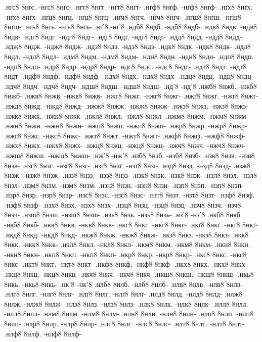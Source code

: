 {.нґс8 8нґс. -нґс8 8нґс-
.нґт8 8нґт. -нґт8 8нґт-
.нґф8 8нґф. -нґф8 8нґф-
.нґх8 8нґх. -нґх8 8нґх-
.нґц8 8нґц. -нґц8 8нґц-
.нґч8 8нґч. -нґч8 8нґч-
.нґш8 8нґш. -нґш8 8нґш-
.нґь8 8нґь. -нґь8 8нґь-
.нґ'8 -нґ'8
.ндб8 8ндб. -ндб8 8ндб-
.ндв8 8ндв. -ндв8 8ндв-
.ндг8 8ндг. -ндг8 8ндг-
.ндґ8 8ндґ. -ндґ8 8ндґ-
.ндд8 8ндд. -ндд8 8ндд-
.ндж8 8ндж. -ндж8 8ндж-
.ндз8 8ндз. -ндз8 8ндз-
.ндк8 8ндк. -ндк8 8ндк-
.ндл8 8ндл. -ндл8 8ндл-
.ндм8 8ндм. -ндм8 8ндм-
.ндн8 8ндн. -ндн8 8ндн-
.ндп8 8ндп. -ндп8 8ндп-
.ндр8 8ндр. -ндр8 8ндр-
.ндс8 8ндс. -ндс8 8ндс-
.ндт8 8ндт. -ндт8 8ндт-
.ндф8 8ндф. -ндф8 8ндф-
.ндх8 8ндх. -ндх8 8ндх-
.ндц8 8ндц. -ндц8 8ндц-
.ндч8 8ндч. -ндч8 8ндч-
.ндш8 8ндш. -ндш8 8ндш-
.нд'8 -нд'8
.нжб8 8нжб. -нжб8 8нжб-
.нжв8 8нжв. -нжв8 8нжв-
.нжг8 8нжг. -нжг8 8нжг-
.нжґ8 8нжґ. -нжґ8 8нжґ-
.нжд8 8нжд. -нжд8 8нжд-
.нжж8 8нжж. -нжж8 8нжж-
.нжз8 8нжз. -нжз8 8нжз-
.нжк8 8нжк. -нжк8 8нжк-
.нжл8 8нжл. -нжл8 8нжл-
.нжм8 8нжм. -нжм8 8нжм-
.нжн8 8нжн. -нжн8 8нжн-
.нжп8 8нжп. -нжп8 8нжп-
.нжр8 8нжр. -нжр8 8нжр-
.нжс8 8нжс. -нжс8 8нжс-
.нжт8 8нжт. -нжт8 8нжт-
.нжф8 8нжф. -нжф8 8нжф-
.нжх8 8нжх. -нжх8 8нжх-
.нжц8 8нжц. -нжц8 8нжц-
.нжч8 8нжч. -нжч8 8нжч-
.нжш8 8нжш. -нжш8 8нжш-
.нж'8 -нж'8
.нзб8 8нзб. -нзб8 8нзб-
.нзв8 8нзв. -нзв8 8нзв-
.нзг8 8нзг. -нзг8 8нзг-
.нзґ8 8нзґ. -нзґ8 8нзґ-
.нзд8 8нзд. -нзд8 8нзд-
.нзж8 8нзж. -нзж8 8нзж-
.нзз8 8нзз. -нзз8 8нзз-
.нзк8 8нзк. -нзк8 8нзк-
.нзл8 8нзл. -нзл8 8нзл-
.нзм8 8нзм. -нзм8 8нзм-
.нзн8 8нзн. -нзн8 8нзн-
.нзп8 8нзп. -нзп8 8нзп-
.нзр8 8нзр. -нзр8 8нзр-
.нзс8 8нзс. -нзс8 8нзс-
.нзт8 8нзт. -нзт8 8нзт-
.нзф8 8нзф. -нзф8 8нзф-
.нзх8 8нзх. -нзх8 8нзх-
.нзц8 8нзц. -нзц8 8нзц-
.нзч8 8нзч. -нзч8 8нзч-
.нзш8 8нзш. -нзш8 8нзш-
.нзь8 8нзь. -нзь8 8нзь-
.нз'8 -нз'8
.нкб8 8нкб. -нкб8 8нкб-
.нкв8 8нкв. -нкв8 8нкв-
.нкг8 8нкг. -нкг8 8нкг-
.нкґ8 8нкґ. -нкґ8 8нкґ-
.нкд8 8нкд. -нкд8 8нкд-
.нкж8 8нкж. -нкж8 8нкж-
.нкз8 8нкз. -нкз8 8нкз-
.нкк8 8нкк. -нкк8 8нкк-
.нкл8 8нкл. -нкл8 8нкл-
.нкм8 8нкм. -нкм8 8нкм-
.нкн8 8нкн. -нкн8 8нкн-
.нкп8 8нкп. -нкп8 8нкп-
.нкр8 8нкр. -нкр8 8нкр-
.нкс8 8нкс. -нкс8 8нкс-
.нкт8 8нкт. -нкт8 8нкт-
.нкф8 8нкф. -нкф8 8нкф-
.нкх8 8нкх. -нкх8 8нкх-
.нкц8 8нкц. -нкц8 8нкц-
.нкч8 8нкч. -нкч8 8нкч-
.нкш8 8нкш. -нкш8 8нкш-
.нкь8 8нкь. -нкь8 8нкь-
.нк'8 -нк'8
.нлб8 8нлб. -нлб8 8нлб-
.нлв8 8нлв. -нлв8 8нлв-
.нлг8 8нлг. -нлг8 8нлг-
.нлґ8 8нлґ. -нлґ8 8нлґ-
.нлд8 8нлд. -нлд8 8нлд-
.нлж8 8нлж. -нлж8 8нлж-
.нлз8 8нлз. -нлз8 8нлз-
.нлк8 8нлк. -нлк8 8нлк-
.нлл8 8нлл. -нлл8 8нлл-
.нлм8 8нлм. -нлм8 8нлм-
.нлн8 8нлн. -нлн8 8нлн-
.нлп8 8нлп. -нлп8 8нлп-
.нлр8 8нлр. -нлр8 8нлр-
.нлс8 8нлс. -нлс8 8нлс-
.нлт8 8нлт. -нлт8 8нлт-
.нлф8 8нлф. -нлф8 8нлф-
}
